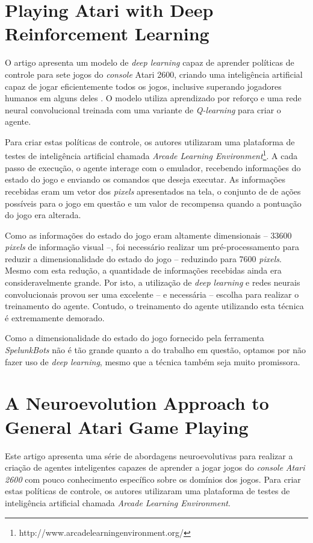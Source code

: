 \section{Playing Atari with Deep Reinforcement Learning}
O artigo apresenta um modelo de \textit{deep learning} capaz de aprender
políticas de controle para sete jogos do \textit{console} Atari 2600, criando
uma inteligência artificial capaz de jogar eficientemente todos os jogos,
inclusive superando jogadores humanos em alguns
deles \cite{DBLP:journals/corr/MnihKSGAWR13}. O modelo utiliza aprendizado por
reforço e uma rede neural convolucional treinada com uma variante de
\textit{Q-learning} para criar o agente.

Para criar estas políticas de controle, os autores utilizaram uma plataforma de
testes de inteligência artificial chamada \textit{Arcade Learning
Environment}\footnote{http://www.arcadelearningenvironment.org/}.  A cada passo
de execução, o agente interage com o emulador, recebendo informações do estado
do jogo e enviando os comandos que deseja executar. As informações recebidas
eram um vetor dos \textit{pixels} apresentados na tela, o conjunto de de ações
possíveis para o jogo em questão e um valor de recompensa quando a pontuação do
jogo era alterada.

Como as informações do estado do jogo eram altamente dimensionais -- 33600
\textit{pixels} de informação visual --, foi necessário realizar um
pré-processamento para reduzir a dimensionalidade do estado do jogo -- reduzindo
para 7600 \textit{pixels}. Mesmo com esta redução, a quantidade de informações
recebidas ainda era consideravelmente grande. Por isto, a utilização de
\textit{deep learning} e redes neurais convolucionais provou ser uma excelente
-- e necessária -- escolha para realizar o treinamento do agente. Contudo, o
treinamento do agente utilizando esta técnica é extremamente demorado.

Como a dimensionalidade do estado do jogo fornecido pela ferramenta
\textit{SpelunkBots} não é tão grande quanto a do trabalho em questão, optamos
por não fazer uso de \textit{deep learning}, mesmo que a técnica também seja
muito promissora.


\section{A Neuroevolution Approach to General Atari Game Playing}
Este artigo \cite{NeuroEvolutionAtari} apresenta uma série de abordagens
neuroevolutivas para realizar a criação de agentes inteligentes capazes de
aprender a jogar jogos do \textit{console} \textit{Atari 2600} com pouco
conhecimento específico sobre os domínios dos jogos. Para criar estas políticas
de controle, os autores utilizaram uma plataforma de testes de inteligência
artificial chamada \textit{Arcade Learning Environment}.

